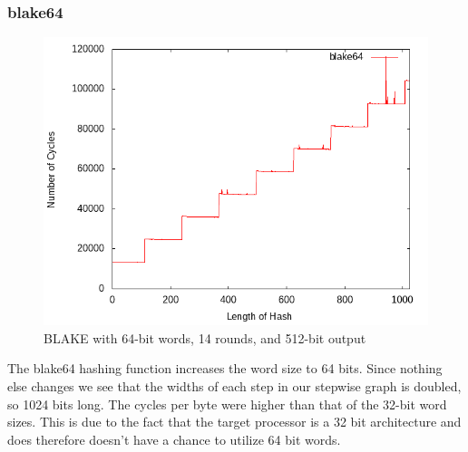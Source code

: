\documentclass[10pt,a4paper]{article}
\begin{document}
\subsubsection{blake64}
    \begin{figure}[H]
        \begin{center}
            \includegraphics[scale=0.5]{images_fast_run/blake64.png} 
            \caption{BLAKE with 64-bit words, 14 rounds, and 512-bit output }
        \end{center}
    \end{figure}
The blake64 hashing function increases the word size to 64 bits. Since nothing else changes we see that the widths of each step in our 
stepwise graph is doubled, so 1024 bits long. The cycles per byte were higher than that of the 32-bit word sizes. This is due to the 
fact that the target processor is a 32 bit architecture and does therefore doesn't have a chance to utilize 64 bit words. 
\end{document}

